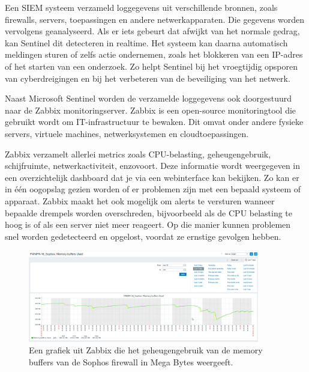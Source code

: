 \vspace{5mm}
Een SIEM systeem verzameld loggegevens uit verschillende bronnen, zoals firewalls, servers, toepassingen en andere netwerkapparaten. Die gegevens worden vervolgens geanalyseerd. Als er iets gebeurt dat afwijkt van het normale gedrag, kan Sentinel dit detecteren in realtime. Het systeem kan daarna automatisch meldingen sturen of zelfs actie ondernemen, zoals het blokkeren van een IP-adres of het starten van een onderzoek. Zo helpt Sentinel bij het vroegtijdig opsporen van cyberdreigingen en bij het verbeteren van de beveiliging van het netwerk.


Naast Microsoft Sentinel worden de verzamelde loggegevens ook doorgestuurd naar de Zabbix monitoringserver. Zabbix is een open-source monitoringtool die gebruikt wordt om IT-infrastructuur te bewaken. Dit omvat onder andere fysieke servers, virtuele machines, netwerksystemen en cloudtoepassingen.

\vspace{5mm}
Zabbix verzamelt allerlei metrics zoals CPU-belasting, geheugengebruik, schijfruimte, netwerkactiviteit, enzovoort. Deze informatie wordt weergegeven in een overzichtelijk dashboard dat je via een webinterface kan bekijken. Zo kan er in één oogopslag gezien worden of er problemen zijn met een bepaald systeem of apparaat.
Zabbix maakt het ook mogelijk om alerts te versturen wanneer bepaalde drempels worden overschreden, bijvoorbeeld als de CPU belasting te hoog is of als een server niet meer reageert. Op die manier kunnen problemen snel worden gedetecteerd en opgelost, voordat ze ernstige gevolgen hebben.

\begin{figure}[H]
    \centering
    \includegraphics[width=0.9\textwidth]{fotos/SophosZabbix.png}
    \caption[Sophos Memory Buffer in Zabbix]{\label{fig:grail}Een grafiek uit Zabbix die het geheugengebruik van de memory buffers van de Sophos firewall in Mega Bytes weergeeft.}
\end{figure} 


